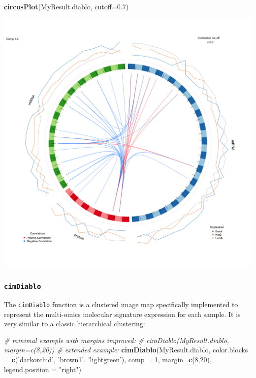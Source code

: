 \documentclass[]{book}
\newenvironment{Shaded}{\begin{snugshade}}{\end{snugshade}}
\newcommand{\CommentTok}[1]{\textcolor[rgb]{0.56,0.35,0.01}{\textit{#1}}}
\newcommand{\DataTypeTok}[1]{\textcolor[rgb]{0.13,0.29,0.53}{#1}}
\newcommand{\DecValTok}[1]{\textcolor[rgb]{0.00,0.00,0.81}{#1}}
\newcommand{\FloatTok}[1]{\textcolor[rgb]{0.00,0.00,0.81}{#1}}
\newcommand{\KeywordTok}[1]{\textcolor[rgb]{0.13,0.29,0.53}{\textbf{#1}}}
\newcommand{\NormalTok}[1]{#1}
\newcommand{\StringTok}[1]{\textcolor[rgb]{0.31,0.60,0.02}{#1}}
\begin{document}
\begin{Shaded}
\begin{Highlighting}[]
\KeywordTok{circosPlot}\NormalTok{(MyResult.diablo, }\DataTypeTok{cutoff=}\FloatTok{0.7}\NormalTok{)}
\end{Highlighting}
\end{Shaded}

\begin{center}\includegraphics[width=0.75\linewidth,]{Figures/06-diablo-circosPlot-1} \end{center}

\hypertarget{cimdiablo}{%
\subsubsection{\texorpdfstring{\texttt{cimDiablo}}{cimDiablo}}\label{cimdiablo}}

The \texttt{cimDiablo} function is a clustered image map specifically implemented to represent the multi-omics molecular signature expression for each sample. It is very similar to a classic hierarchical clustering:

\begin{Shaded}
\begin{Highlighting}[]
\CommentTok{# minimal example with margins improved:}
\CommentTok{# cimDiablo(MyResult.diablo, margin=c(8,20))}
\CommentTok{# extended example:}
\KeywordTok{cimDiablo}\NormalTok{(MyResult.diablo, }\DataTypeTok{color.blocks =} \KeywordTok{c}\NormalTok{(}\StringTok{'darkorchid'}\NormalTok{, }\StringTok{'brown1'}\NormalTok{, }\StringTok{'lightgreen'}\NormalTok{), }\DataTypeTok{comp =} \DecValTok{1}\NormalTok{, }\DataTypeTok{margin=}\KeywordTok{c}\NormalTok{(}\DecValTok{8}\NormalTok{,}\DecValTok{20}\NormalTok{), }\DataTypeTok{legend.position =} \StringTok{"right"}\NormalTok{)}
\end{Highlighting}
\end{Shaded}
\end{document}
